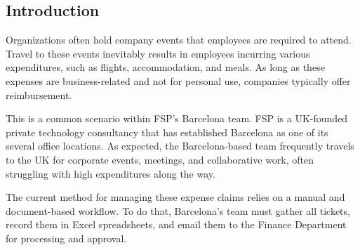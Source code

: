 \subsection{Introduction}
Organizations often hold company events that employees are required to attend. Travel to these events inevitably results in employees incurring various expenditures, such as flights, accommodation, and meals. As long as these expenses are business-related and not for personal use, companies typically offer reimbursement.

This is a common scenario within FSP's Barcelona team. FSP is a UK-founded private technology consultancy that has established Barcelona as one of its several office locations. As expected, the Barcelona-based team frequently travels to the UK for corporate events, meetings, and collaborative work, often struggling with high expenditures along the way. 

The current method for managing these expense claims relies on a manual and document-based workflow. To do that, Barcelona's team must gather all tickets, record them in Excel spreadsheets, and email them to the Finance Department for processing and approval.

